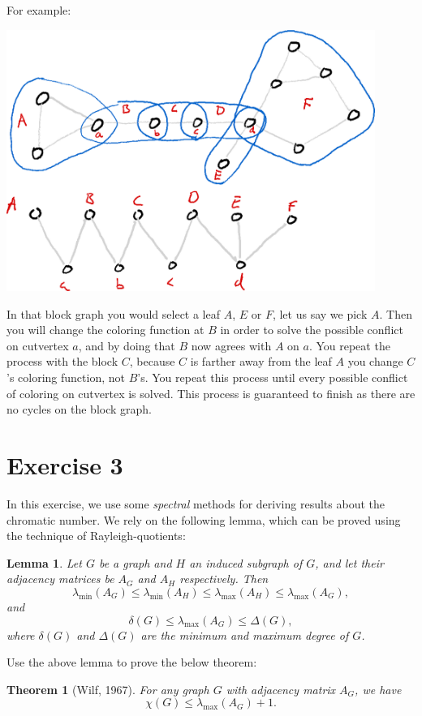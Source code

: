 \documentclass{article}
\newtheorem{lemma}{Lemma}
\newtheorem{theorem}{Theorem}
\begin{document}
For example:

\includegraphics[width=0.9\textwidth]{graph_with_blockgraph.png}

In that block graph you would select a leaf $A$, $E$ or $F$, let us say we pick $A$. Then you will change the coloring function at $B$ in order to solve the possible conflict on cutvertex $a$, and by doing that $B$ now agrees with $A$ on $a$. You repeat the process with the block $C$, because $C$ is farther away from the leaf $A$ you change $C$'s coloring function, not $B$'s. You repeat this process until every possible conflict of coloring on cutvertex is solved. This process is guaranteed to finish as there are no cycles on the block graph. 

\section*{Exercise 3}
 In this exercise, we use some \emph{spectral} methods for deriving results about the chromatic number. We rely on the following lemma, which can be proved using the technique of Rayleigh-quotients:

\begin{lemma}
  Let $G$ be a graph and $H$ an induced subgraph of $G$, and let their adjacency matrices be $A_G$ and $A_H$ respectively. Then
  $$\lambda_{\min}\left(A_G\right) \leq \lambda_{\min}\left(A_H\right) \leq \lambda_{\max}\left(A_H\right) \leq \lambda_{\max}\left(A_G\right),$$
  and
  $$\delta(G) \leq \lambda_{\max}\left(A_G\right) \leq \Delta(G),$$
  where $\delta(G)$ and $\Delta(G)$ are the minimum and maximum degree of $G$.
\end{lemma}

Use the above lemma to prove the below theorem:
\begin{theorem}[Wilf, 1967]
  For any graph $G$ with adjacency matrix $A_G$, we have
  $$\chi(G) \leq \lambda_{\max}\left(A_G\right) + 1.$$
\end{theorem}
\end{document}
